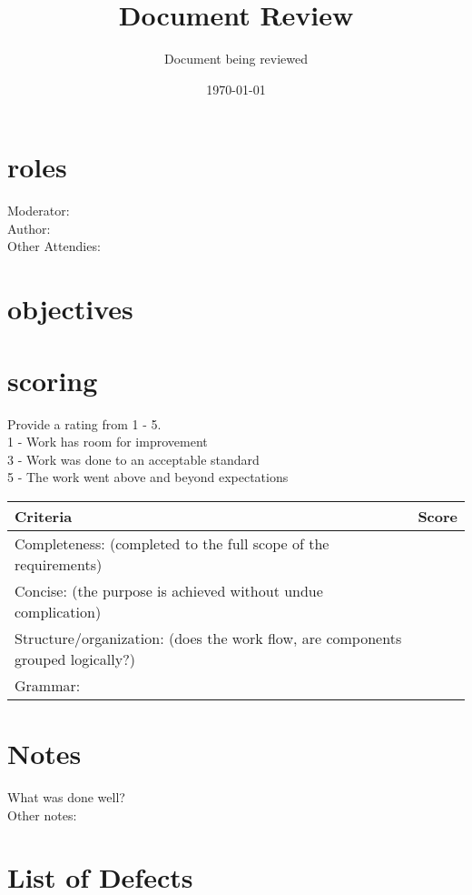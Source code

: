 \documentclass{article}
\title{Document Review}
\author{Document being reviewed}
\date{\today}
\begin{document}
\maketitle

\section{roles}
Moderator: \\
Author: \\
Other Attendies: \\

\section{objectives}

\section{scoring}
    Provide a rating from 1 - 5. \\
    1 - Work has room for improvement \\
    3 - Work was done to an acceptable standard \\
    5 - The work went above and beyond expectations\\

\begin{tabular}{|l|c|}
	\hline
	Criteria & Score\\
	\hline
    Completeness:
    (completed to the full scope of the requirements) & \\
	\hline
    Concise:
    (the purpose is achieved without undue complication) & \\
	\hline
    Structure/organization:
    (does the work flow, are components grouped logically?) & \\
    \hline
    Grammar: & \\
    \hline
\end{tabular}

\section{Notes}
    
What was done well?\\
    
Other notes:\\
    
\pagebreak

\section{List of Defects}
\end{document}
